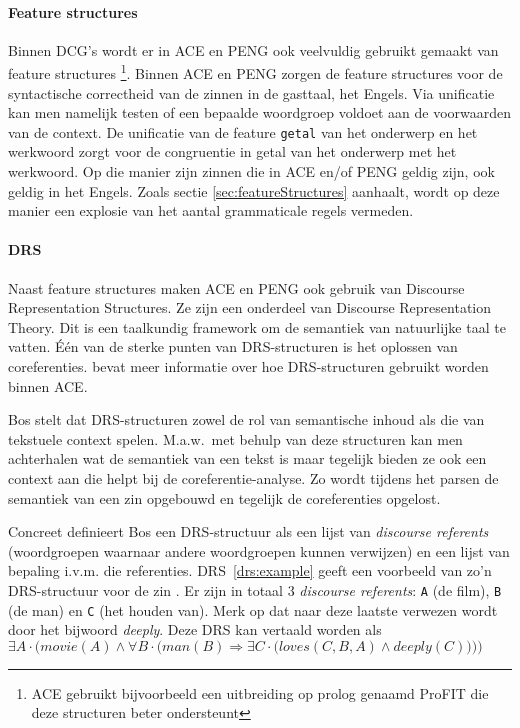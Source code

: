 \paragraph{Feature structures} Binnen DCG's wordt er in ACE en PENG ook veelvuldig gebruikt gemaakt van feature structures \cite{Shieber2003, NLPCourse} \footnote{ACE gebruikt bijvoorbeeld een uitbreiding op prolog genaamd ProFIT \cite{Erbach1995} die deze structuren beter ondersteunt}. Binnen ACE en PENG zorgen de feature structures voor de syntactische correctheid van de zinnen in de gasttaal, het Engels. Via unificatie kan men namelijk testen of een bepaalde woordgroep voldoet aan de voorwaarden van de context. De unificatie van de feature \texttt{getal} van het onderwerp en het werkwoord zorgt voor de congruentie in getal van het onderwerp met het werkwoord. Op die manier zijn zinnen die in ACE en/of PENG geldig zijn, ook geldig in het Engels. Zoals sectie \ref{sec:featureStructures} aanhaalt, wordt op deze manier een explosie van het aantal grammaticale regels vermeden.

\paragraph{DRS} Naast feature structures maken ACE en PENG ook gebruik van Discourse Representation Structures. Ze zijn een onderdeel van Discourse Representation Theory. Dit is een taalkundig framework om de semantiek van natuurlijke taal te vatten. Één van de sterke punten van DRS-structuren is het oplossen van coreferenties. \cite{Fuchs2008drs} bevat meer informatie over hoe DRS-structuren gebruikt worden binnen ACE.

Bos \cite{Bos2011} stelt dat DRS-structuren zowel de rol van semantische inhoud als die van tekstuele context spelen. M.a.w.\ met behulp van deze structuren kan men achterhalen wat de semantiek van een tekst is maar tegelijk bieden ze ook een context aan die helpt bij de coreferentie-analyse. Zo wordt tijdens het parsen de semantiek van een zin opgebouwd en tegelijk de coreferenties opgelost.

Concreet definieert Bos \cite{Bos2011} een DRS-structuur als een lijst van \textit{discourse referents} (woordgroepen waarnaar andere woordgroepen kunnen verwijzen) en een lijst van bepaling i.v.m. die referenties. DRS~\ref{drs:example} geeft een voorbeeld van zo'n DRS-structuur voor de zin . Er zijn in totaal 3 \textit{discourse referents}: \texttt{A} (de film), \texttt{B} (de man) en \texttt{C} (het houden van). Merk op dat naar deze laatste verwezen wordt door het bijwoord \textit{deeply}. Deze DRS kan vertaald worden als $\exists A \cdot \bigg(movie(A) \land \forall B \cdot \Big(man(B) \Rightarrow \exists C \cdot \big( loves(C, B, A) \land deeply(C) \big)\Big)\bigg)$

